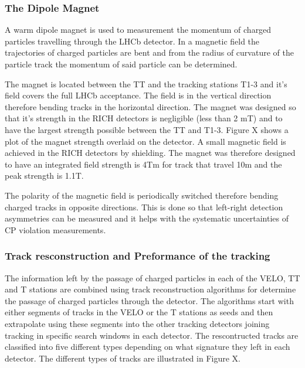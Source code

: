 \subsubsection{The Dipole Magnet}
A warm dipole magnet is used to measurement the momentum of charged particles travelling through the LHCb detector. In a magnetic field the trajectories of charged particles are bent and from the radius of curvature of the particle track the momentum of said particle can be determined.

The magnet is located between the TT and the tracking stations T1-3 and it’s field covers the full LHCb acceptance. The field is in the vertical direction therefore bending tracks in the horizontal direction. The magnet was designed so that it’s strength in the RICH detectors is negligible (less than 2 mT) and to have the largest strength possible between the TT and T1-3. Figure X shows a plot of the magnet strength overlaid on the detector. A small magnetic field is achieved in the RICH detectors by shielding. The magnet was therefore designed to have an integrated field strength is 4Tm for track that travel 10m and the peak strength is 1.1T. %

The polarity of the magnetic field is periodically switched therefore bending charged tracks in opposite directions. This is done so that left-right detection asymmetries can be measured and it helps with the systematic uncertainties of CP violation measurements. %

\subsubsection{Track resconstruction and Preformance of the tracking}


The information left by the passage of charged particles in each of the VELO, TT and T stations are combined using track reconstruction algorithms for determine the passage of charged particles through the detector. The algorithms start with either segments of tracks in the VELO or the T stations as seeds and then extrapolate using these segments into the other tracking detectors joining tracking in specific search windows in each detector. The rescontructed tracks are classified into five different types depending on what signature they left in each detector. The different types of tracks are illustrated in Figure X. 

